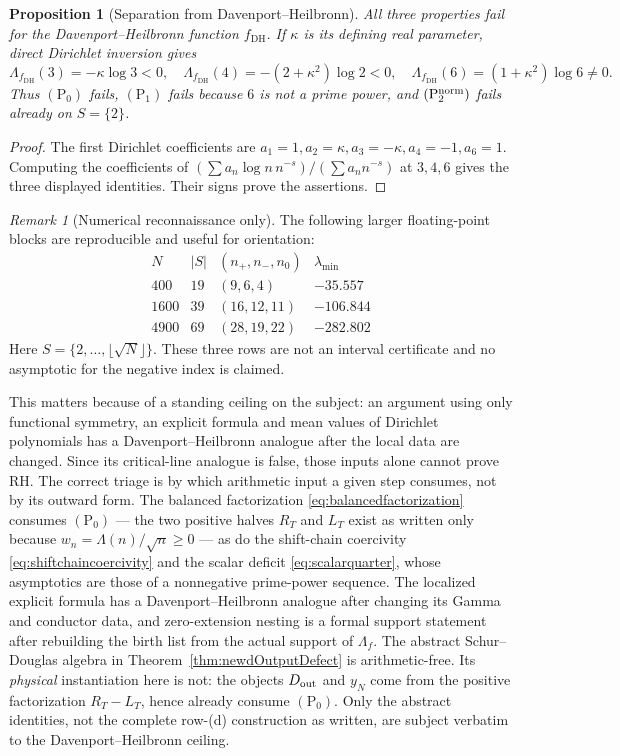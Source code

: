 \documentclass[11pt]{amsart}
\newtheorem{proposition}[theorem]{Proposition}
\theoremstyle{definition}
\theoremstyle{remark}
\newtheorem{remark}[theorem]{Remark}
\newcommand{\RH}{\mathrm{RH}}
\begin{document}
\begin{proposition}[Separation from Davenport--Heilbronn]
\label{prop:DHseparation}
All three properties fail for the Davenport--Heilbronn function
$f_{\mathrm{DH}}$.  If $\kappa$ is its defining real parameter, direct
Dirichlet inversion gives
\[
 \Lambda_{f_{\mathrm{DH}}}(3)=-\kappa\log3<0,
 \quad
 \Lambda_{f_{\mathrm{DH}}}(4)=-(2+\kappa^2)\log2<0,
 \quad
 \Lambda_{f_{\mathrm{DH}}}(6)=(1+\kappa^2)\log6\ne0.
\]
Thus $\mathrm{(P_0)}$ fails, $\mathrm{(P_1)}$ fails because $6$ is not a
prime power, and $\mathrm{(P_2^{\rm norm})}$ fails already on $S=\{2\}$.
\end{proposition}

\begin{proof}
The first Dirichlet coefficients are
$a_1=1,a_2=\kappa,a_3=-\kappa,a_4=-1,a_6=1$.  Computing the coefficients of
$(\sum a_n\log n\,n^{-s})/(\sum a_nn^{-s})$ at $3,4,6$ gives the three
displayed identities.  Their signs prove the assertions.
\end{proof}

\begin{remark}[Numerical reconnaissance only]
The following larger floating-point blocks are reproducible and useful for
orientation:
\[
\begin{array}{c|c|c|c}
N&|S|&(n_+,n_-,n_0)&\lambda_{\min}\\ \hline
 400 &19&(9,6,4)&-35.557\\
1600 &39&(16,12,11)&-106.844\\
4900 &69&(28,19,22)&-282.802
\end{array}
\]
Here $S=\{2,\dots,\lfloor\sqrt N\rfloor\}$.  These three rows are not an
interval certificate and no asymptotic for the negative index is claimed.
\end{remark}

This matters because of a standing ceiling on the subject: an argument using
only functional symmetry, an explicit formula and mean values of Dirichlet
polynomials has a Davenport--Heilbronn analogue after the local data are
changed.  Since its critical-line analogue is false, those inputs alone
cannot prove $\RH$.  The correct triage is by which arithmetic input a given
step consumes, not by its outward form.  The balanced factorization
\eqref{eq:balancedfactorization} consumes $\mathrm{(P_0)}$ --- the two
positive halves $R_T$ and $L_T$ exist as written only because
$w_n=\Lambda(n)/\sqrt n\ge0$ --- as do the shift-chain coercivity
\eqref{eq:shiftchaincoercivity} and the scalar deficit
\eqref{eq:scalarquarter}, whose asymptotics are those of a nonnegative
prime-power sequence.  The localized explicit formula has a
Davenport--Heilbronn analogue after changing its Gamma and conductor data,
and zero-extension nesting is a formal support statement after rebuilding
the birth list from the actual support of $\Lambda_f$.  The abstract
Schur--Douglas algebra in Theorem~\ref{thm:newdOutputDefect} is
arithmetic-free.  Its \emph{physical} instantiation here is not: the objects
$D_{\rm out}$ and $y_N$ come from the positive factorization $R_T-L_T$, hence
already consume $\mathrm{(P_0)}$.  Only the abstract identities, not the
complete row-(d) construction as written, are subject verbatim to the
Davenport--Heilbronn ceiling.
\end{document}

